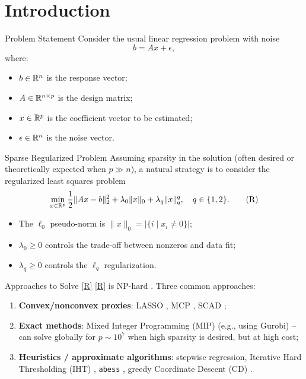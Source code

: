 \section{Introduction}


\begin{frame}{Problem Statement}
Consider the usual linear regression problem with noise
\[
b = Ax + \epsilon, \tag{P}\label{P}
\]
where:
\begin{itemize}
\item $b \in \mathbb{R}^n$ is the response vector;
\item $A \in \mathbb{R}^{n \times p}$ is the design matrix;
\item $x \in \mathbb{R}^p$ is the coefficient vector to be estimated;
\item $\epsilon \in \mathbb{R}^n$ is the noise vector.
\end{itemize}
\end{frame}

\begin{frame}{Sparse Regularized Problem}
Assuming sparsity in the solution (often desired or theoretically expected when $p \gg n$), a natural strategy is to consider the regularized least squares problem
\[
\min_{x \in \mathbb{R}^p} \frac{1}{2} \|Ax-b\|_2^2 + \lambda_0 \|x\|_0 + \lambda_q \|x\|_q^q,\quad q \in \{1,2\}. \tag{R}\label{R}
\]
\begin{itemize}
\item The $\ell_0$ pseudo-norm is $\|x\|_0 = |\{i \mid x_i \neq 0\}|$;
\item $\lambda_0 \ge 0$ controls the trade-off between nonzeros and data fit;
\item $\lambda_q \ge 0$ controls the $\ell_q$ regularization.
\end{itemize}
\end{frame}

\begin{frame}{Approaches to Solve \eqref{R}}
\eqref{R} is NP-hard \cite{nphard}. Three common approaches:
\begin{enumerate}
\item \textbf{Convex/nonconvex proxies}: LASSO \cite{lasso}, MCP \cite{mcp}, SCAD \cite{scad};
\item \textbf{Exact methods}: Mixed Integer Programming (MIP) \cite{mio} (e.g., using Gurobi) – can solve globally for $p \sim 10^7$ when high sparsity is desired, but at high cost;
\item \textbf{Heuristics / approximate algorithms}: stepwise regression, Iterative Hard Thresholding (IHT) \cite{iht}, \texttt{abess} \cite{abess}, greedy Coordinate Descent (CD) \cite{gcd,fastselect}.
\end{enumerate}
\end{frame}

